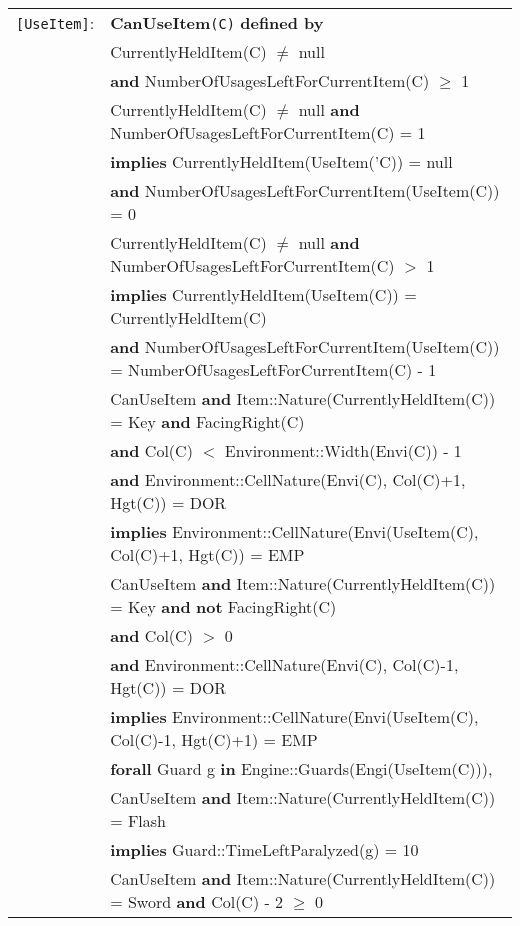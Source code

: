 \documentclass[7pt]{article}
\begin{document}
\begin{tabular}{rl}

\texttt{[UseItem]}:  & \textbf{CanUseItem}\texttt{(C)} \textbf{defined by} \\ 
&\quad\quad CurrentlyHeldItem(C) $\neq$ null \\
&\quad\quad \textbf{and} NumberOfUsagesLeftForCurrentItem(C) $\geq$ 1  \\
&  CurrentlyHeldItem(C) $\neq$ null \textbf{and} NumberOfUsagesLeftForCurrentItem(C) = 1 \\
& \quad \textbf{implies}  CurrentlyHeldItem(UseItem('C)) = null \\
& \quad\quad \textbf{and} NumberOfUsagesLeftForCurrentItem(UseItem(C)) = 0 \\
&  CurrentlyHeldItem(C) $\neq$ null \textbf{and} NumberOfUsagesLeftForCurrentItem(C) $>$ 1 \\
& \quad \textbf{implies}  CurrentlyHeldItem(UseItem(C)) = CurrentlyHeldItem(C) \\
& \quad\quad \textbf{and} NumberOfUsagesLeftForCurrentItem(UseItem(C)) = NumberOfUsagesLeftForCurrentItem(C) - 1 \\
& CanUseItem \textbf{and} Item::Nature(CurrentlyHeldItem(C)) = Key \textbf{and} FacingRight(C) \\
& \quad \textbf{and} Col(C) $<$ Environment::Width(Envi(C)) - 1 \\
& \quad \textbf{and} Environment::CellNature(Envi(C), Col(C)+1, Hgt(C)) = DOR \\
& \quad \textbf{implies} Environment::CellNature(Envi(UseItem(C), Col(C)+1, Hgt(C)) = EMP \\
& CanUseItem \textbf{and} Item::Nature(CurrentlyHeldItem(C)) = Key \textbf{and} \textbf{not} FacingRight(C) \\
& \quad \textbf{and} Col(C) $>$ 0 \\
& \quad \textbf{and} Environment::CellNature(Envi(C), Col(C)-1, Hgt(C)) = DOR \\
& \quad \textbf{implies} Environment::CellNature(Envi(UseItem(C), Col(C)-1, Hgt(C)+1) = EMP \\
& \textbf{forall} Guard g \textbf{in} Engine::Guards(Engi(UseItem(C))), \\
&  \quad CanUseItem \textbf{and} Item::Nature(CurrentlyHeldItem(C)) = Flash \\
& \quad\quad \textbf{implies} Guard::TimeLeftParalyzed(g) = 10 \\
& CanUseItem \textbf{and} Item::Nature(CurrentlyHeldItem(C)) = Sword \textbf{and} Col(C) - 2 $\geq$  0 \\

\end{tabular}
\end{document}
